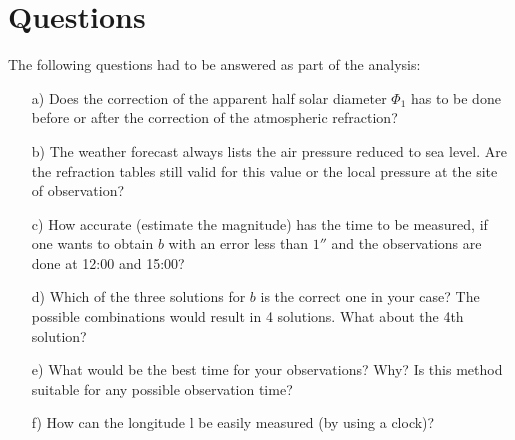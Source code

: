
\section{Questions}
The following questions had to be answered as part of the analysis:
\begin{itemize}
\item[a)] Does the correction of the apparent half solar diameter $\Phi_1$ has to be done before or after the correction of the atmospheric refraction?
\item[b)] The weather forecast always lists the air pressure reduced to sea level.  Are the refraction tables still valid
for this value or the local pressure at the site of observation?
\item[c)] How accurate (estimate the magnitude) has the time to be measured,  if one wants to obtain $b$ with an
error less than $1''$ and the observations are done at 12:00 and 15:00?
\item[d)] Which of the three solutions for $b$ is the correct one in your case? The possible combinations would result in 4 solutions.  What about the 4th solution?
\item[e)] What would be the best time for your observations? Why? Is this method suitable for any possible
observation time?
\item[f)]How can the longitude l be easily measured (by using a clock)?
\end{itemize}